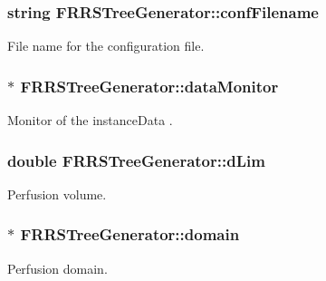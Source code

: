 \subsubsection[{\texorpdfstring{conf\+Filename}{confFilename}}]{\setlength{\rightskip}{0pt plus 5cm}string F\+R\+R\+S\+Tree\+Generator\+::conf\+Filename\hspace{0.3cm}{\ttfamily [private]}}\hypertarget{class_f_r_r_s_tree_generator_a5223ff3d634e30abe72a9156f364fce2}{}\label{class_f_r_r_s_tree_generator_a5223ff3d634e30abe72a9156f364fce2}
File name for the configuration file. 
\subsubsection[{\texorpdfstring{data\+Monitor}{dataMonitor}}]{$\ast$ F\+R\+R\+S\+Tree\+Generator\+::data\+Monitor\hspace{0.3cm}{\ttfamily [private]}}\hypertarget{class_f_r_r_s_tree_generator_a8a6b326c69ca8feeee284ecdf741df00}{}\label{class_f_r_r_s_tree_generator_a8a6b326c69ca8feeee284ecdf741df00}
Monitor of the {\ttfamily instance\+Data} . 
\subsubsection[{\texorpdfstring{d\+Lim}{dLim}}]{\setlength{\rightskip}{0pt plus 5cm}double F\+R\+R\+S\+Tree\+Generator\+::d\+Lim\hspace{0.3cm}{\ttfamily [private]}}\hypertarget{class_f_r_r_s_tree_generator_afd3e174612083f26557c69374a4aabd9}{}\label{class_f_r_r_s_tree_generator_afd3e174612083f26557c69374a4aabd9}
Perfusion volume. 
\subsubsection[{\texorpdfstring{domain}{domain}}]{$\ast$ F\+R\+R\+S\+Tree\+Generator\+::domain\hspace{0.3cm}{\ttfamily [private]}}\hypertarget{class_f_r_r_s_tree_generator_a0322f396324a87545b29a7abce226ba6}{}\label{class_f_r_r_s_tree_generator_a0322f396324a87545b29a7abce226ba6}
Perfusion domain. 
